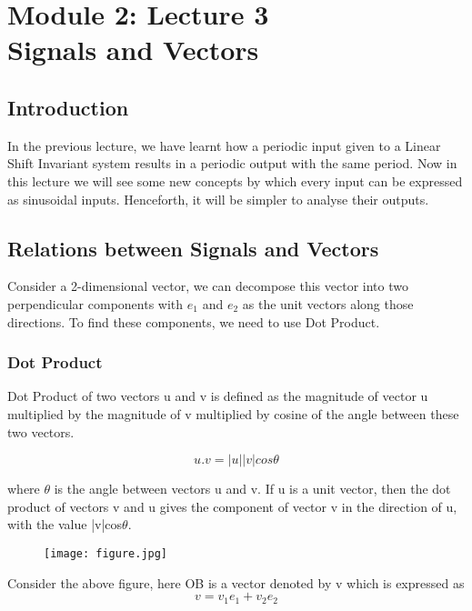 \section{Module 2: Lecture 3\\Signals and Vectors}

\subsection{Introduction}
In the previous lecture, we have learnt how a periodic input given to a Linear Shift Invariant system results in a periodic output with the same period. Now in this lecture we will see some new concepts by which every input can be expressed as sinusoidal inputs. Henceforth, it will be simpler to analyse their outputs.

\subsection{Relations between Signals and Vectors}
\label{sec:examples}
Consider a 2-dimensional vector, we can decompose this vector into two perpendicular components with $e_1$ and $e_2$ as the unit vectors along those directions. To find these components, we need to use Dot Product.
\subsubsection{Dot Product}
	Dot Product of two vectors u and v is defined as the magnitude of vector u multiplied by the magnitude of v multiplied by cosine of the angle between these two vectors.
    
	    					\begin{equation*}u.v = |u||v|cos\theta\end{equation*}
                            
where $\theta$ is the angle between vectors u and v. If u is a unit vector, then the dot product of vectors v and u gives the component of vector v in the direction of u, with the value |v|cos$\theta$.
	\begin{figure}[ht]
\centering
\texttt{[image: figure.jpg]}
\end{figure}
    
    
    Consider the above figure, here OB is a vector denoted by v which is expressed as
    \begin{equation*}v = v_1e_1 + v_2e_2\end{equation*}
    
